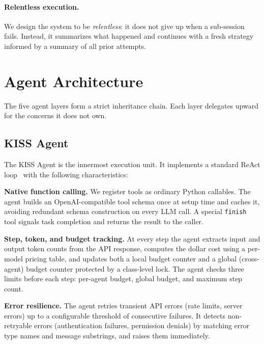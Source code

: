 \documentclass{article}
\begin{document}
\paragraph{Relentless execution.}
We design the system to be \emph{relentless}: it does not give up
when a sub-session fails.  Instead, it summarizes what happened and
continues with a fresh strategy informed by a summary of all prior
attempts.

\section{Agent Architecture}
\label{sec:architecture}

The five agent layers form a strict inheritance chain.  Each layer
delegates upward for the concerns it does not own.

\subsection{KISS Agent}
\label{sec:kiss-agent}

The KISS Agent is the innermost execution unit.  It implements a
standard ReAct loop~\citep{yao2023react} with the following
characteristics:

\textbf{Native function calling.}  We register tools as ordinary
Python callables.  The agent builds an OpenAI-compatible tool schema
once at setup time and caches it, avoiding redundant schema
construction on every LLM call.  A special \texttt{finish} tool
signals task completion and returns the result to the caller.

\textbf{Step, token, and budget tracking.}  At every step the agent
extracts input and output token counts from the API response, computes
the dollar cost using a per-model pricing table, and updates both a
local budget counter and a global (cross-agent) budget counter
protected by a class-level lock.  The agent checks three limits before
each step: per-agent budget, global budget, and maximum step count.

\textbf{Error resilience.}  The agent retries transient API errors
(rate limits, server errors) up to a configurable threshold of
consecutive failures.  It detects non-retryable errors (authentication
failures, permission denials) by matching error type names and message
substrings, and raises them immediately.
\end{document}
